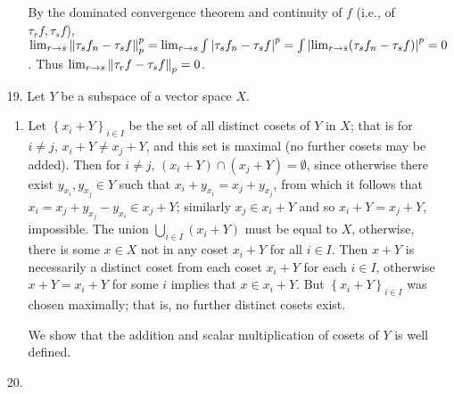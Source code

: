 \documentclass[11pt,leqno]{article}
\theoremstyle{plain}
\theoremstyle{definition}
\numberwithin{equation}{section}
\numberwithin{lem}{section}
\newcommand{\cbr}[1]{\left\{#1\right\}}
\begin{document}
\begin{enumerate}
\begin{enumerate}
    By the dominated convergence theorem and continuity of $f$ (i.e., of $\tau_rf,\tau_sf$), $\lim_{r\to s} \norm{\tau_sf_n - \tau_s f}_p^p = \lim_{r\to s} \int \abs{\tau_sf_n - \tau_s f}^p = \int \abs{\lim_{r\to s}(\tau_sf_n - \tau_s f)}^p = 0$. Thus $\lim_{r\to s}\norm{\tau_rf - \tau_s f}_p = 0$.
  \end{enumerate}
  
  \item[19.] Let $Y$ be a subspace of a vector space $X$.
  \begin{enumerate}
    \item Let $\cbr{x_i + Y}_{i\in I}$ be the set of all distinct cosets of $Y$ in $X$; that is for $i\neq j$, $x_i+ Y\neq x_j + Y$, and this set is maximal (no further cosets may be added). Then for $i\neq j$, $(x_i + Y)\cap (x_j + Y) = \emptyset$, since otherwise there exist $y_{x_i},y_{x_j}\in Y$ such that $x_i + y_{x_i} = x_j + y_{x_j}$, from which it follows that $x_i = x_j + y_{x_j} - y_{x_i}\in x_j + Y$; similarly $x_j\in x_i + Y$ and so $x_i+ Y = x_j + Y$, impossible. The union $\bigcup_{i\in I}(x_i + Y)$ must be equal to $X$, otherwise, there is some $x\in X$ not in any coset $x_i + Y$ for all $i\in I$. Then $x + Y$ is necessarily a distinct coset from each coset $x_i + Y$ for each $i\in I$, otherwise $x +Y = x_i+Y$ for some $i$ implies that $x\in x_i + Y$. But $\cbr{x_i + Y}_{i\in I}$ was chosen maximally; that is, no further distinct cosets exist.
    
    We show that the addition and scalar multiplication of cosets of $Y$ is well defined. 
  \end{enumerate}
  
  \item[20.] 
\end{enumerate}
\end{document}
